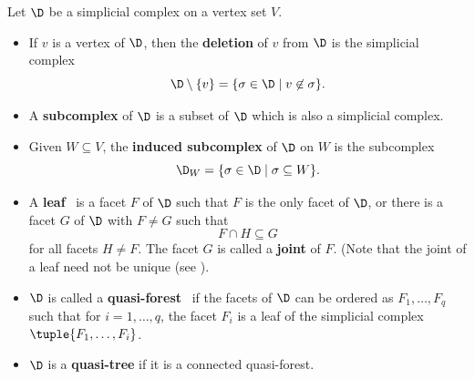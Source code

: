 \begin{defi}
\label{d:defs} Let $\D$ be a simplicial complex on a vertex set $V$.
\begin{itemize}
\item If $v$ is a vertex of $\D$, then the {\bf deletion} of $v$ from
  $\D$ is the simplicial complex
$$\D \setminus \{v\} = \{ \sigma \in \D \mid v \not \in \sigma\}.$$

\item A {\bf subcomplex} of $\D$ is a subset of $\D$ which is also a
  simplicial complex.

\item Given $W \subseteq V$, the {\bf induced subcomplex} of $\D$ on
  $W$ is the subcomplex
$$\D_W=\{ \sigma \in \D \mid \sigma \subseteq W\}.$$

\item A {\bf leaf}~\cite{F02} is a facet $F$ of $\D$ such that $F$ is
the only facet of $\D$, or there is a facet $G$ of $\D$ with $F\ne G$
such that
$$F\cap H \subseteq G$$ for all facets $H \neq F$. The facet $G$ is
called a {\bf joint} of $F$. (Note that the joint of a leaf need not
be unique \textup{(}see \cite{F02}\textup{)}.

\item $\D$ is called a {\bf quasi-forest}~\cite{Z} if the facets of
$\D$ can be ordered as $F_1,\ldots, F_q$ such that for
$i=1,\ldots,q$, the facet $F_i$ is a leaf of the simplicial complex
$\tuple{F_1,\ldots,F_i}$.

\item $\D$ is a {\bf quasi-tree} if it is a connected quasi-forest.
\end{itemize}
\end{defi}

